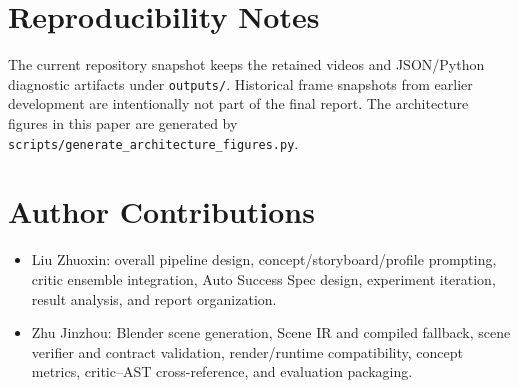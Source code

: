 \documentclass[10pt,letterpaper]{article}
\begin{document}



\appendix

\section{Reproducibility Notes}

The current repository snapshot keeps the retained videos and JSON/Python
diagnostic artifacts under \texttt{outputs/}. Historical frame snapshots
from earlier development are intentionally not part of the final report.
The architecture figures in this paper are generated by
\texttt{scripts/generate\_architecture\_figures.py}.

\section{Author Contributions}

\begin{itemize}[leftmargin=*,topsep=2pt,itemsep=2pt]
  \item Liu Zhuoxin: overall pipeline design, concept/storyboard/profile
        prompting, critic ensemble integration, Auto Success Spec design,
        experiment iteration, result analysis, and report organization.
  \item Zhu Jinzhou: Blender scene generation, Scene IR and compiled fallback,
        scene verifier and contract validation, render/runtime compatibility,
        concept metrics, critic--AST cross-reference, and evaluation
        packaging.
\end{itemize}
\end{document}
